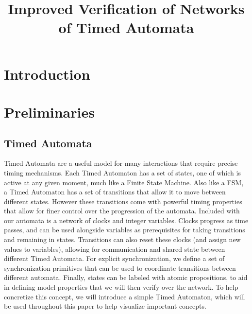 \documentclass[a4paper,12pt]{article}
\begin{document}
\title{Improved Verification of Networks of Timed Automata}
  

\tableofcontents
\listoffigures
\listoftables

\section{Introduction}\label{introduction}

\section{Preliminaries}\label{prelims}
\subsection{Timed Automata}\label{timed-automata}

Timed Automata are a useful model for many interactions that require precise
timing mechanisms. Each Timed Automaton has a set of states, one of which is
active at any given moment, much like a Finite State Machine. Also like a FSM, a
Timed Automaton has a set of transitions that allow it to move between different
states. However these transitions come with powerful timing properties that
allow for finer control over the progression of the automata. Included with our
automata is a network of clocks and integer variables. Clocks progress as time
passes, and can be used alongside variables as prerequisites for taking
transitions and remaining in states. Transitions can also reset these clocks
(and assign new values to variables), allowing for communication and shared
state between different Timed Automata. For explicit synchronization, we
define a set of synchronization primitives that can be used to coordinate
transitions between different automata. Finally, states can be labeled with
atomic propositions, to aid in defining model properties that we will then
verify over the network. To help concretize this concept, we will introduce a
simple Timed Automaton, which will be used throughout this paper to help
visualize important concepts.
\end{document}
